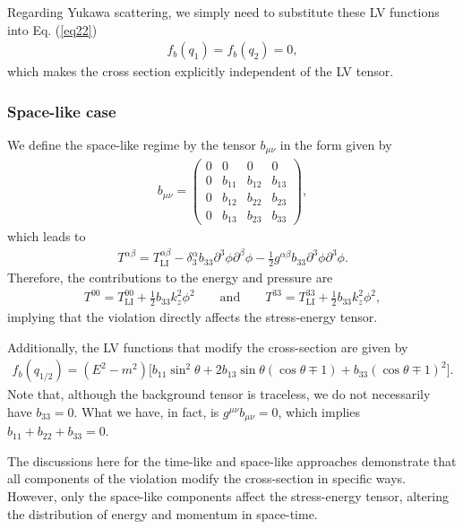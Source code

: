 \documentclass[11pt,showpacs,preprintnumbers,amsmath,amssymb,prd,nofootinbib,superscriptaddress]{revtex4-2}
\begin{document}
Regarding Yukawa scattering, we simply need to substitute these LV functions into Eq. (\ref{eq22})
\begin{eqnarray}
    f_b(q_1)=f_b(q_2)=0,
\end{eqnarray}
which makes the cross section explicitly independent of the LV tensor.


\subsubsection{Space-like case}

We define the space-like regime by the tensor $b_{\mu \nu}$ in the form given by
\begin{eqnarray}
 b_{\mu\nu}=   \begin{pmatrix}
          0&0&0&0 \\ 
          0&b_{11}&b_{12}&b_{13}\\
          0&b_{12}&b_{22}&b_{23}\\
          0&b_{13}&b_{23}&b_{33}
    \end{pmatrix},
\end{eqnarray}
which leads to
\begin{eqnarray}
T^{\alpha\beta}=T^{\alpha\beta}_{\text{LI}}-\delta^\alpha_3b_{33}\partial^3\phi\partial^\beta\phi-\frac{1}{2}g^{\alpha\beta}b_{33}\partial^3\phi\partial^3\phi.
\end{eqnarray}
Therefore, the contributions to the energy and pressure are
\begin{eqnarray}
T^{00}=T^{00}_{\text{LI}}+\frac{1}{2}b_{33}k_z^2\phi^2\quad\quad\text{and}\quad\quad T^{33}=T^{33}_{\text{LI}}+\frac{1}{2}b_{33}k_z^2\phi^2,
\end{eqnarray}
implying that the violation directly affects the stress-energy tensor.

Additionally, the LV functions that modify the cross-section are given by
\begin{eqnarray}
    f_b(q_{1/2})=(E^2-m^2)\biggl[b_{11}\sin^2{\theta}+2b_{13}\sin{\theta}(\cos{\theta}\mp1)+b_{33}(\cos{\theta}\mp1)^2\biggr].
\end{eqnarray}
Note that, although the background tensor is traceless, we do not necessarily have $b_{33}=0$. What we have, in fact, is $g^{\mu\nu}b_{\mu\nu}=0$,  which implies $b_{11}+b_{22}+b_{33}=0$.

The discussions here for the time-like and space-like approaches demonstrate that all components of the violation modify the cross-section in specific ways. However, only the space-like components affect the stress-energy tensor, altering the distribution of energy and momentum in space-time.
\end{document}
